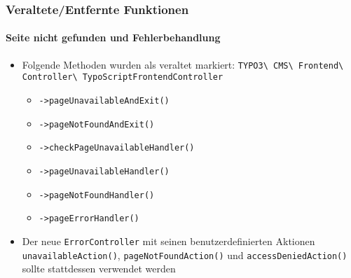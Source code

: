 \begin{frame}[fragile]
	\frametitle{Veraltete/Entfernte Funktionen}
	\framesubtitle{Seite nicht gefunden und Fehlerbehandlung}

	\begin{itemize}
		\item Folgende Methoden wurden als veraltet markiert:\newline
			\smaller
				\texttt{TYPO3\textbackslash
					CMS\textbackslash
					Frontend\textbackslash
					Controller\textbackslash
					TypoScriptFrontendController}
			\normalsize

			\begin{itemize}
				\item \texttt{->pageUnavailableAndExit()}
				\item \texttt{->pageNotFoundAndExit()}
				\item \texttt{->checkPageUnavailableHandler()}
				\item \texttt{->pageUnavailableHandler()}
				\item \texttt{->pageNotFoundHandler()}
				\item \texttt{->pageErrorHandler()}
			\end{itemize}

		\item Der neue \texttt{ErrorController} mit seinen benutzerdefinierten Aktionen
			\texttt{unavailableAction()}, \texttt{pageNotFoundAction()} und
			\texttt{accessDeniedAction()} sollte stattdessen verwendet werden

	\end{itemize}

\end{frame}


